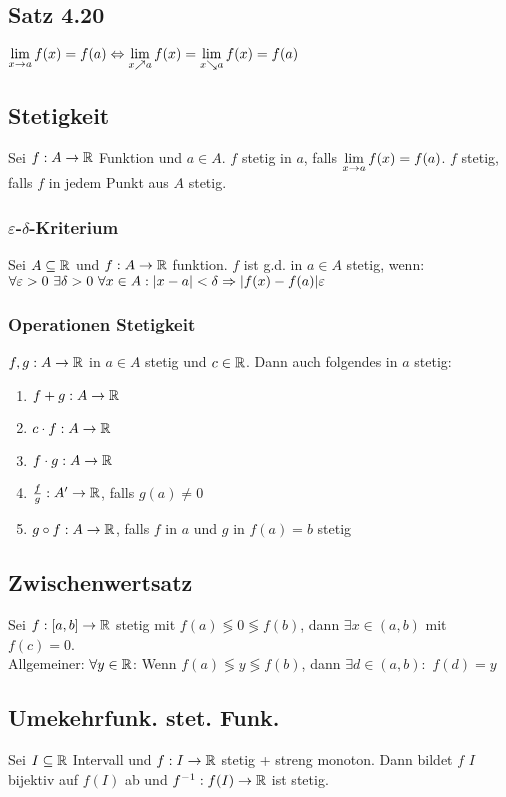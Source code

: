 \subsection*{Satz 4.20}
$\lim\limits_{x \rightarrow a} f(x) = f(a) \Leftrightarrow \lim\limits_{x \nearrow a} f(x) = \lim\limits_{x \searrow a} f(x) = f(a)$
\subsection*{Stetigkeit}
Sei $f: A \rightarrow \mathbb R$ Funktion und $a \in A$. $f$ stetig in $a$, falls $\lim\limits_{x \rightarrow a} f(x) = f(a)$. $f$ stetig, falls $f$ in jedem Punkt aus $A$ stetig.
\subsubsection*{\texorpdfstring{$\varepsilon$}{Epsilon}-\texorpdfstring{$\delta$}{Delta}-Kriterium}
Sei $A \subseteq \mathbb R$ und $f: A \rightarrow \mathbb R$ funktion. $f$ ist g.d. in $a \in A$ stetig, wenn: $\forall \varepsilon > 0 \ \exists \delta > 0 \ \forall x \in A: |x- a| < \delta \Ra |f(x) - f(a)| \varepsilon$
\subsubsection*{Operationen Stetigkeit}
$f, g: A \rightarrow \mathbb R$ in $a \in A$ stetig und $c \in \mathbb R$. Dann auch folgendes in $a$ stetig:
\begin{enumerate}[label=\alph*., noitemsep]
    \item $f + g: A \rightarrow \mathbb R$
    \item $c \cdot f: A \rightarrow \mathbb R$
    \item $f \cdot g: A \rightarrow \mathbb R$
    \item $\frac{f}{g}: A' \rightarrow \mathbb R$, falls $g(a) \neq 0$
    \item $g \circ f: A \rightarrow \mathbb R$, falls $f$ in $a$ und $g$ in $f(a) = b$ stetig
\end{enumerate}
\subsection*{Zwischenwertsatz}
Sei $f: [a, b] \rightarrow \mathbb R$ stetig mit $f(a) \lessgtr 0 \lessgtr f(b)$, dann $\exists x \in (a, b)$ mit $f(c)= 0$.\\
Allgemeiner: $\forall y \in\mathbb R$: Wenn $f(a) \lessgtr y \lessgtr f(b)$, dann $\exists d \in (a, b):$ $f(d) = y$
\subsection*{Umekehrfunk. stet. Funk.}
Sei $I \subseteq\mathbb R$ Intervall und $f: I \rightarrow \mathbb R$ stetig + streng monoton. Dann bildet $f$ $I$ bijektiv auf $f(I)$ ab und $f^{-1}: f(I)\rightarrow \mathbb R$ ist stetig.
